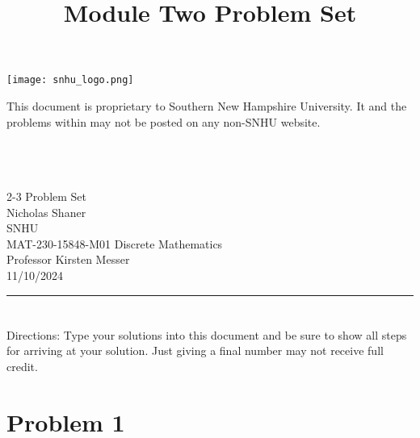 \documentclass{amsart}
\theoremstyle{definition}
\theoremstyle{Exercise}
\theoremstyle{remark}
\theoremstyle{rule}
\numberwithin{equation}{section}
\begin{document}
\title{\sf Module Two Problem Set}

\begin{center}
\texttt{[image: snhu\_logo.png]}
\end{center}

\maketitle
This document is proprietary to Southern New Hampshire University. It and the problems within may not be posted on any non-SNHU website.\\\\\\\\
\begin{center}\doublespacing
2-3 Problem Set\\
Nicholas Shaner\\
SNHU\\
MAT-230-15848-M01 Discrete Mathematics\\
Professor Kirsten Messer\\
11/10/2024\\
\end{center}


\begin{center}
\rule{\textwidth}{0.4pt}
\end{center}


\newpage


\newpage

\section*{}
\section*{}

Directions: Type your solutions into this document and be sure to show all steps for arriving at your solution. Just giving a final number may not receive full credit.\\

\section*{Problem 1}
\end{document}
